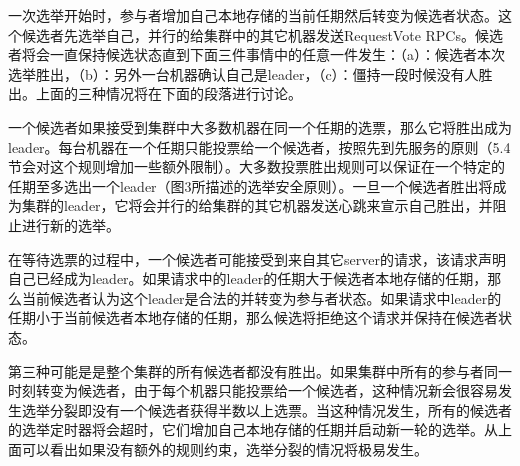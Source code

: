 \documentclass[journal]{IEEEtran}
\begin{document}
一次选举开始时，参与者增加自己本地存储的当前任期然后转变为候选者状态。这个候选者先选举自己，并行的给集群中的其它机器发送RequestVote RPCs。候选者将会一直保持候选状态直到下面三件事情中的任意一件发生：（a）：候选者本次选举胜出，（b）：另外一台机器确认自己是leader，（c）：僵持一段时候没有人胜出。上面的三种情况将在下面的段落进行讨论。


一个候选者如果接受到集群中大多数机器在同一个任期的选票，那么它将胜出成为leader。每台机器在一个任期只能投票给一个候选者，按照先到先服务的原则（5.4节会对这个规则增加一些额外限制）。大多数投票胜出规则可以保证在一个特定的任期至多选出一个leader（图3所描述的选举安全原则）。一旦一个候选者胜出将成为集群的leader，它将会并行的给集群的其它机器发送心跳来宣示自己胜出，并阻止进行新的选举。


在等待选票的过程中，一个候选者可能接受到来自其它server的请求，该请求声明自己已经成为leader。如果请求中的leader的任期大于候选者本地存储的任期，那么当前候选者认为这个leader是合法的并转变为参与者状态。如果请求中leader的任期小于当前候选者本地存储的任期，那么候选将拒绝这个请求并保持在候选者状态。


第三种可能是是整个集群的所有候选者都没有胜出。如果集群中所有的参与者同一时刻转变为候选者，由于每个机器只能投票给一个候选者，这种情况新会很容易发生选举分裂即没有一个候选者获得半数以上选票。当这种情况发生，所有的候选者的选举定时器将会超时，它们增加自己本地存储的任期并启动新一轮的选举。从上面可以看出如果没有额外的规则约束，选举分裂的情况将极易发生。
\end{document}
